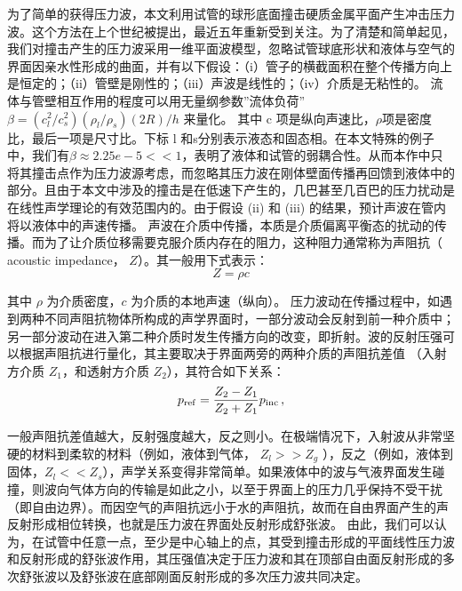 为了简单的获得压力波，本文利用试管的球形底面撞击硬质金属平面产生冲击压力波。这个方法在上个世纪被提出，最近五年重新受到关注。为了清楚和简单起见，我们对撞击产生的压力波采用一维平面波模型，忽略试管球底形状和液体与空气的界面因亲水性形成的曲面，并有以下假设：（i）管子的横截面积在整个传播方向上是恒定的；（ii）管壁是刚性的；（iii）声波是线性的；（iv）介质是无粘性的。
流体与管壁相互作用的程度可以用无量纲参数''流体负荷''
$\beta=(c_l^2/c_s^2)(\rho _l/\rho_s)(2R)/h$ 
来量化\cite{shepherd_shock_2010}。
其中 c 项是纵向声速比，$\rho$项是密度比，最后一项是尺寸比。下标 l 和s分别表示液态和固态相。在本文特殊的例子中，我们有$\beta\approx2.25e-5<<1$，表明了液体和试管的弱耦合性。从而本作中只将其撞击点作为压力波源考虑，而忽略其压力波在刚体壁面传播再回馈到液体中的部分。且由于本文中涉及的撞击是在低速下产生的，几巴甚至几百巴的压力扰动是在线性声学理论的有效范围内的\cite{dynamics_applied_nodate}。由于假设
(ii) 和 (iii) 的结果，预计声波在管内将以液体中的声速传播。
声波在介质中传播，本质是介质偏离平衡态的扰动的传播。而为了让介质位移需要克服介质内存在的阻力，这种阻力通常称为声阻抗（
acoustic impedance， $Z$）。其一般用下式表示：
\begin{equation}
    Z=\rho c
\label{2.2}
\end{equation}

其中 $\rho$ 为介质密度，$c$ 为介质的本地声速（纵向）。
压力波动在传播过程中，如遇到两种不同声阻抗物体所构成的声学界面时，一部分波动会反射到前一种介质中；另一部分波动在进入第二种介质时发生传播方向的改变，即折射。波的反射压强可以根据声阻抗进行量化，其主要取决于界面两旁的两种介质的声阻抗差值
（入射方介质 $Z_1$，和透射方介质 $Z_2$），其符合如下关系：
\begin{equation}
p_{\mathrm{ref}}=\frac{Z_{\mathrm{2}}-Z_{\mathrm{1}}}{Z_{\mathrm{2}}+Z_{\mathrm{1}}}p_{\mathrm{inc}}\\ \,,
    \label{2.3}
\end{equation}

一般声阻抗差值越大，反射强度越大，反之则小。在极端情况下，入射波从非常坚硬的材料到柔软的材料（例如，液体到气体，
$Z_l>>Z_g$
），反之（例如，液体到固体，$Z_l<<Z_s$），声学关系变得非常简单。如果液体中的波与气液界面发生碰撞，则波向气体方向的传输是如此之小，以至于界面上的压力几乎保持不受干扰（即自由边界）。而因空气的声阻抗远小于水的声阻抗，故而在自由界面产生的声反射形成相位转换，也就是压力波在界面处反射形成舒张波。
由此，我们可以认为，在试管中任意一点，至少是中心轴上的点，其受到撞击形成的平面线性压力波和反射形成的舒张波作用，其压强值决定于压力波和其在顶部自由面反射形成的多次舒张波以及舒张波在底部刚面反射形成的多次压力波共同决定。

